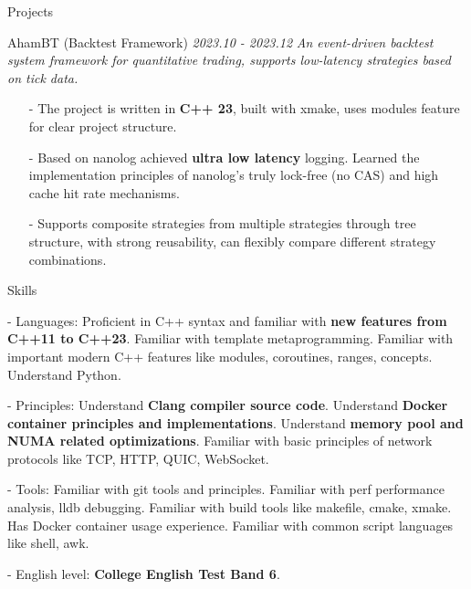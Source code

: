 \documentclass{resume} %
\begin{document}
\begin{rSection}{Projects}
\begin{rSubsection}
{AhamBT (Backtest Framework)} {\em 2023.10 - 2023.12} 
{\textit{An event-driven backtest system framework for quantitative trading, supports low-latency strategies based on tick data.} \\}
{}
\item[]
\begin{itemize}
    \setlength\itemsep{-0.5em}
    \item[-] The project is written in \textbf{C++ 23}, built with xmake, uses modules feature for clear project structure.
    \item[-] Based on nanolog achieved \textbf{ultra low latency} logging. Learned the implementation principles of nanolog's truly lock-free (no CAS) and high cache hit rate mechanisms.
    \item[-] Supports composite strategies from multiple strategies through tree structure, with strong reusability, can flexibly compare different strategy combinations. 
\end{itemize}
\end{rSubsection}
\end{rSection}


\begin{rSection}{Skills}
\begin{rSubsection}
{}{}{}{}
\item[-] Languages: Proficient in C++ syntax and familiar with \textbf{new features from C++11 to C++23}. Familiar with template metaprogramming. Familiar with important modern C++ features like modules, coroutines, ranges, concepts. Understand Python.  
\item[-] Principles: Understand \textbf{Clang compiler source code}. Understand \textbf{Docker container principles and implementations}. Understand \textbf{memory pool and NUMA related optimizations}. Familiar with basic principles of network protocols like TCP, HTTP, QUIC, WebSocket.
\item[-] Tools: Familiar with git tools and principles. Familiar with perf performance analysis, lldb debugging. Familiar with build tools like makefile, cmake, xmake. Has Docker container usage experience. Familiar with common script languages like shell, awk.
\item[-] English level: \textbf{College English Test Band 6}.  
\end{rSubsection}
\end{rSection}

\end{document}
